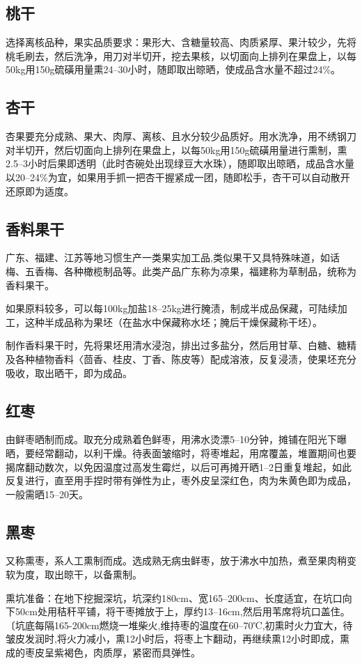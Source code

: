 \documentclass{ctexbook}
\begin{document}
\subsection{桃干}
选择离核品种，果实品质要求：果形大、含糖量较高、肉质紧厚、果汁较少，先将桃毛刷去，然后洗净，用刀对半切开，挖去果核，以切面向上排列在果盘上，以每50kg用150g硫磺用量熏24--30小时，随即取出晾晒，使成品含水量不超过24\%。
\subsection{杏干}
杏果要充分成熟、果大、肉厚、离核、且水分较少品质好。用水洗净，用不绣钢刀对半切开，然后切面向上排列在果盘上，以每50kg用150g硫磺用量进行熏制，熏2.5--3小时后果即透明（此时杏碗处出现绿豆大水珠），随即取出晾晒，成品含水量以20--24\%为宜，如果用手抓一把杏干握紧成一团，随即松手，杏干可以自动散开还原即为适度。
\subsection{香料果干}
广东、福建、江苏等地习惯生产一类果实加工品,类似果干又具特殊味道，如话梅、五香梅、各种橄榄制品等。此类产品广东称为凉果，福建称为草制品，统称为香料果干。

如果原料较多，可以每100kg加盐18--25kg进行腌渍，制成半成品保藏，可陆续加工，这种半成品称为果坯（在盐水中保藏称水坯；腌后干燥保藏称干坯）。

制作香料果干时，先将果坯用清水浸泡，排出过多盐分，然后用甘草、白糖、糖精及各种植物香料〈茴香、桂皮、丁香、陈皮等）配成溶液，反复浸渍，使果坯充分吸收，取出晒干，即为成品。

\subsection{红枣}
由鲜枣晒制而成。取充分成熟着色鲜枣，用沸水烫漂5--10分钟，摊铺在阳光下曝晒，要经常翻动，以利干燥。待表面皱缩时，将枣堆起，用席覆盖，堆置期间也要揭席翻动数次，以免因温度过高发生霉烂，以后可再摊开晒1--2日重复堆起，如此反复进行，直至用手捏时带有弹性为止，枣外皮呈深红色，肉为朱黄色即为成品，一般需晒15--20天。
\subsection{黑枣}
又称熏枣，系人工熏制而成。选成熟无病虫鲜枣，放于沸水中加热，煮至果肉稍变软为度，取出晾干，以备熏制。

熏坑准备：在地下挖掘深坑，坑深约180cm、宽165--200cm、长度适宜，在坑口向下50cm处用秸秆平铺，将干枣摊放于上，厚约13--16cm,然后用苇席将坑口盖住。〔坑底每隔165-200cm燃烧一堆柴火,维持枣的温度在60--70℃,初熏时火力宜大，待皱皮发润时,将火力减小，熏12小时后，将枣上卞翻动，再继续熏12小时即成，熏成的枣皮呈紫褐色，肉质厚，紧密而具弹性。
\end{document}
